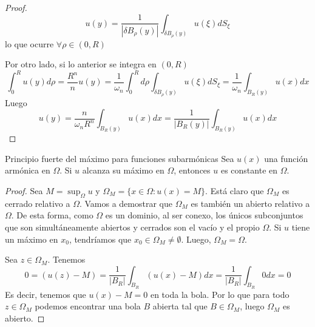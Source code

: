 \begin{proof}
$$u(y) = \frac{1}{|\delta B_\rho(y)|}\int_{\delta B_\rho(y)}u(\xi)dS_\xi$$
lo que ocurre $\forall \rho \in (0,R)$

Por otro lado, si lo anterior se integra en $(0,R)$
$$\int_0^R u(y) d\rho = \frac{R^n}{n}u(y) = \frac{1}{\omega_n} \int_0^R d\rho \int_{\delta B_\rho(y)} u (\xi) dS_\xi = \frac{1}{\omega_n}\int_{B_R(y)} u(x) dx$$
Luego 
$$u(y) = \frac{n}{\omega_n R^n}\int_{B_R(y)} u(x) dx = \frac{1}{|B_R(y)|} \int_{B_R(y)} u(x) dx$$
\end{proof}


\begin{mathresult}{Principio fuerte del máximo para funciones subarmónicas}
Sea $u(x)$ una función armónica en $\Omega$. Si $u$ alcanza su máximo en $\Omega$, entonces $u$ es constante en $\Omega$.
\end{mathresult}
\begin{proof}
Sea $M=\sup_\Omega u$ y $\Omega_M = \{x\in\Omega: u(x) = M\}$. Está claro que $\Omega_M$ es cerrado relativo a $\Omega$. Vamos a demostrar que $\Omega_M$ es también un abierto relativo a $\Omega$. De esta forma, como $\Omega$ es un dominio, al ser conexo, los únicos subconjuntos que son simultáneamente abiertos y cerrados son el vacío y el propio $\Omega$. Si $u$ tiene un máximo en $x_0$, tendríamos que $x_0\in\Omega_M\neq\emptyset$. Luego, $\Omega_M = \Omega$.

Sea $z\in\Omega_M$. Tenemos
$$0=(u(z) - M) = \frac{1}{|B_R|}\int_{B_R}(u(x)-M)dx = \frac{1}{|B_R|}\int_{B_R} 0dx = 0$$
Es decir, tenemos que $u(x)-M = 0$ en toda la bola. Por lo que para todo $z\in\Omega_M$ podemos encontrar una bola $B$ abierta tal que $B\in\Omega_M$, luego $\Omega_M$ es abierto.
\end{proof}

